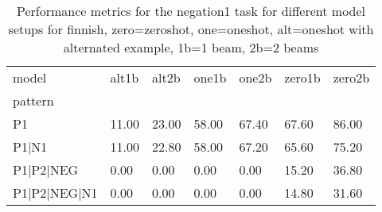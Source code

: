 \begin{table}[h]
\begin{tabular}{l|llllll}
\toprule
model & alt1b & alt2b & one1b & one2b & zero1b & zero2b \\
pattern &  &  &  &  &  &  \\
\midrule
P1 & 11.00 & 23.00 & 58.00 & 67.40 & 67.60 & 86.00 \\
P1|N1 & 11.00 & 22.80 & 58.00 & 67.20 & 65.60 & 75.20 \\
P1|P2|NEG & 0.00 & 0.00 & 0.00 & 0.00 & 15.20 & 36.80 \\
P1|P2|NEG|N1 & 0.00 & 0.00 & 0.00 & 0.00 & 14.80 & 31.60 \\
\bottomrule
\end{tabular}
\caption{Performance metrics for the negation1 task for different model setups for finnish, zero=zeroshot, one=oneshot, alt=oneshot with alternated example, 1b=1 beam, 2b=2 beams}
\label{tab:fi_negation1_performance}
\end{table}
